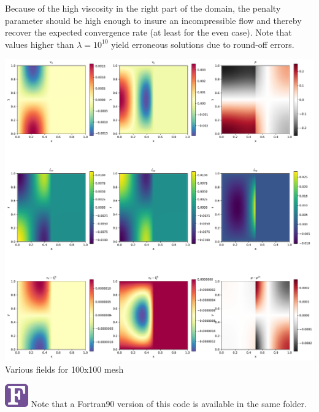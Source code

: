 Because of the high viscosity in the right part of the domain, the penalty parameter should 
be high enough to insure an incompressible flow and thereby recover the expected convergence rate
(at least for the even case). Note that values higher than $\lambda=10^{10}$ yield erroneous solutions 
due to round-off errors. 

\begin{center}
\includegraphics[width=16cm]{python_codes/fieldstone_05/results/solution.pdf}\\
{\captionfont Various fields for 100x100 mesh}
\end{center}


\includegraphics[width=1cm]{images/fortran/fortran} 
Note that a Fortran90 version of this code is available in the same folder. 


